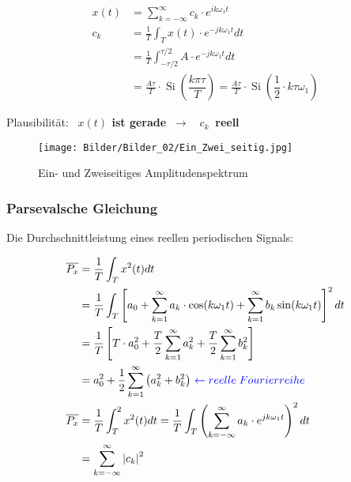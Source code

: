 \begin{equation}
\begin{aligned}
x(t) &=\sum_{k=-\infty}^{\infty} c_{k} \cdot e^{i k \omega_{1} t} \\
c_{k}&=\frac{1}{T} \int_{T} x(t) \cdot e^{-j k \omega_{1} t} d t\\
     &=\frac{1}{T} \int_{-\tau / 2}^{\tau / 2} A \cdot e^{-j k \omega_{1} t} d t\\
     &=\frac{A \tau }{T}\cdot \operatorname{Si} \left( \dfrac{k\pi\tau}{T} \right)= \frac{A \tau }{T}\cdot  \operatorname{Si}(\dfrac{1}{2} \cdot k\tau\omega_1 )  
\end{aligned}
\nonumber
\end{equation}

Plausibilität: \, \textbf{$x(t)$ ist gerade \,$\rightarrow$ \, $c_k$\, reell}\\
\begin{figure}[H]
    \centering
    \texttt{[image: Bilder/Bilder\_02/Ein\_Zwei\_seitig.jpg]}
    \caption{Ein- und Zweiseitiges Amplitudenspektrum}
\end{figure}


\subsubsection{\textbf{Parsevalsche Gleichung}}
Die Durchschnittleistung eines reellen periodischen Signals:

\begin{equation}
    \begin{aligned}
        \overline{P_{x}} &=\frac{1}{T} \int_{T} x^{2}(t) d t \\
        &=\frac{1}{T} \int_{T}\left[a_{0}+\sum_{k=1}^{\infty} a_{k} \cdot \cos (k \omega_{1} t)+\sum_{k=1}^{\infty} b_{k} \sin (k \omega_{1} t)\right]^{2} d t \\
        &=\frac{1}{T}\left[T \cdot a_{0}^{2}+\frac{T}{2} \sum_{k=1}^{\infty} a_{k}^{2}+\frac{T}{2} \sum_{k=1}^{\infty} b_{k}^{2}\right] \\
        &=a_{0}^{2}+\frac{1}{2} \sum_{k=1}^{\infty}\left(a_{k}^{2}+b_{k}^{2}\right) \, \textcolor{blue}{\leftarrow  reelle \;Fourierreihe\,} \\
        \overline{P_{x}} &=\frac{1}{T} \int_{T}^{2} x^{2}(t) d t=\frac{1}{T} \int_{T}\left(\sum_{k=-\infty}^{\infty} a_{k} \cdot e^{j k \omega_{1} t}\right)^{2} d t \\
        &=\sum_{k=-\infty}^{\infty}\left|c_{k}\right|^{2}
    \end{aligned}
    \nonumber
\end{equation}

